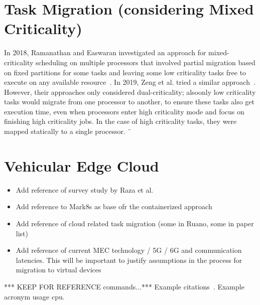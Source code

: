 \section{Task Migration (considering Mixed Criticality)}
In 2018, Ramanathan and Easwaran investigated an approach for mixed-criticality scheduling on multiple processors that involved partial migration based on fixed partitions for some tasks and leaving some low criticality tasks free to execute on any available resource~\parencite{ramanathan1}. In 2019, Zeng et al. tried a similar approach~\parencite{zeng1}. However, their approaches only considered dual-criticality; alsoonly low criticality tasks would migrate from one processor to another, to ensure these tasks also get execution time, even when processors enter high criticality mode and focus on finishing high criticality jobs. In the case of high criticality tasks, they were mapped statically to a single processor.
¨
\section{Vehicular Edge Cloud}
\begin{itemize}
	\item Add reference of survey study by Raza et al.
	\item Add reference to Mark8s as base ofr the containerized approach
	\item Add reference of cloud related task migration (some in Ruano, some in paper list)
	\item Add reference of current MEC technology / 5G / 6G and communication latencies. This will be important to justify assumptions in the process for migration to virtual devices
\end{itemize}



*** KEEP FOR REFERENCE commands...***
Example citations~\cite{barham2003xen, LIS}.
Example acronym usage \gls{cpu}.


	

